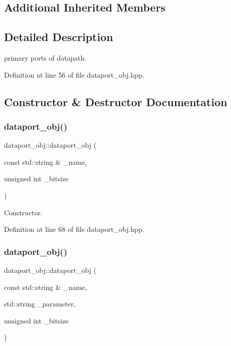 \subsection*{Additional Inherited Members}


\subsection{Detailed Description}
primary ports of datapath. 

Definition at line 56 of file dataport\+\_\+obj.\+hpp.



\subsection{Constructor \& Destructor Documentation}
\mbox{\label{classdataport__obj_ac6209f03a9516ff7f2c8f4ffa2cab16f}} 
\subsubsection{\texorpdfstring{dataport\+\_\+obj()}{dataport\_obj()}\hspace{0.1cm}{\footnotesize\ttfamily [1/2]}}
{\footnotesize\ttfamily dataport\+\_\+obj\+::dataport\+\_\+obj (\begin{DoxyParamCaption}\item[{const std\+::string \&}]{\+\_\+name,  }\item[{unsigned int}]{\+\_\+bitsize }\end{DoxyParamCaption})\hspace{0.3cm}{\ttfamily [inline]}}



Constructor. 



Definition at line 68 of file dataport\+\_\+obj.\+hpp.

\mbox{\label{classdataport__obj_a609a5d2e03e127a315b939503c636c82}} 
\subsubsection{\texorpdfstring{dataport\+\_\+obj()}{dataport\_obj()}\hspace{0.1cm}{\footnotesize\ttfamily [2/2]}}
{\footnotesize\ttfamily dataport\+\_\+obj\+::dataport\+\_\+obj (\begin{DoxyParamCaption}\item[{const std\+::string \&}]{\+\_\+name,  }\item[{std\+::string}]{\+\_\+parameter,  }\item[{unsigned int}]{\+\_\+bitsize }\end{DoxyParamCaption})\hspace{0.3cm}{\ttfamily [inline]}}



